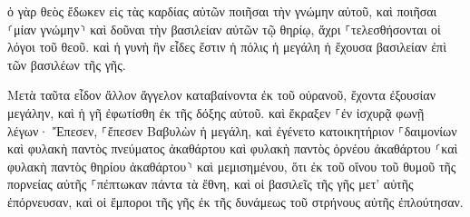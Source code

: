 \documentclass{openreader}
\begin{document}
ὁ γὰρ θεὸς ἔδωκεν εἰς τὰς καρδίας αὐτῶν ποιῆσαι τὴν γνώμην αὐτοῦ, καὶ ποιῆσαι ⸂μίαν γνώμην⸃ καὶ δοῦναι τὴν βασιλείαν αὐτῶν τῷ θηρίῳ, ἄχρι ⸀τελεσθήσονται οἱ λόγοι τοῦ θεοῦ. 
καὶ ἡ γυνὴ ἣν εἶδες ἔστιν ἡ πόλις ἡ μεγάλη ἡ ἔχουσα βασιλείαν ἐπὶ τῶν βασιλέων τῆς γῆς. 

Μετὰ ταῦτα εἶδον ἄλλον ἄγγελον καταβαίνοντα ἐκ τοῦ οὐρανοῦ, ἔχοντα ἐξουσίαν μεγάλην, καὶ ἡ γῆ ἐφωτίσθη ἐκ τῆς δόξης αὐτοῦ. 
καὶ ἔκραξεν ⸀ἐν ἰσχυρᾷ φωνῇ λέγων· Ἔπεσεν, ⸀ἔπεσεν Βαβυλὼν ἡ μεγάλη, καὶ ἐγένετο κατοικητήριον ⸀δαιμονίων καὶ φυλακὴ παντὸς πνεύματος ἀκαθάρτου καὶ φυλακὴ παντὸς ὀρνέου ἀκαθάρτου ⸂καὶ φυλακὴ παντὸς θηρίου ἀκαθάρτου⸃ καὶ μεμισημένου, 
ὅτι ἐκ τοῦ οἴνου τοῦ θυμοῦ τῆς πορνείας αὐτῆς ⸀πέπτωκαν πάντα τὰ ἔθνη, καὶ οἱ βασιλεῖς τῆς γῆς μετ’ αὐτῆς ἐπόρνευσαν, καὶ οἱ ἔμποροι τῆς γῆς ἐκ τῆς δυνάμεως τοῦ στρήνους αὐτῆς ἐπλούτησαν. 
\end{document}
